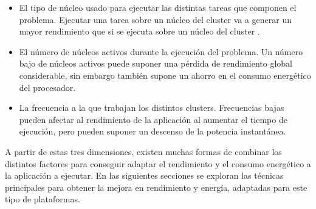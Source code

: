 \begin{itemize}
\item El tipo de núcleo usado para ejecutar las distintas tareas que
  componen el problema. Ejecutar una tarea sobre un núcleo del cluster \BIG
  va a generar un mayor rendimiento que si se ejecuta sobre un núcleo del
  cluster \LITTLE.
\item El número de núcleos activos durante la ejecución del problema. Un
  número bajo de núcleos activos puede suponer una pérdida de rendimiento
  global considerable, sin embargo también supone un ahorro en el consumo
  energético del procesador.
\item La frecuencia a la que trabajan los distintos clusters. Frecuencias
  bajas pueden afectar al rendimiento de la aplicación al aumentar el
  tiempo de ejecución, pero pueden suponer un descenso de la potencia
  instantánea.
\end{itemize}

A partir de estas tres dimensiones, existen muchas formas de combinar los
distintos factores para conseguir adaptar el rendimiento y el consumo
energético a la aplicación a ejecutar. En las siguientes secciones se
exploran las técnicas principales para obtener la mejora en rendimiento y
energía, adaptadas para este tipo de plataformas.

